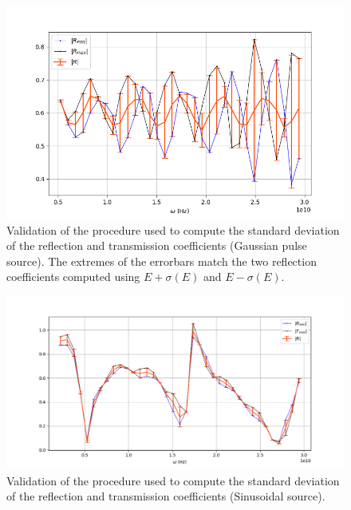 \documentclass[12pt, oneside]{book}
\begin{document}
\begin{figure}
\centering
\includegraphics[scale=0.7]{stdRgauss(4).png}
\caption{Validation of the procedure used to compute the standard deviation of the reflection and transmission coefficients (Gaussian pulse source). The extremes of the errorbars match the two reflection coefficients computed using $E+\sigma(E)$ and $E-\sigma(E)$.}\label{stdRgauss(4)}
\end{figure}

\begin{figure}
\centering
\includegraphics[scale=0.55]{stdRsin(5).png}
\caption{Validation of the procedure used to compute the standard deviation of the reflection and transmission coefficients (Sinusoidal source).}\label{stdR(5)}
\end{figure}
\end{document}
